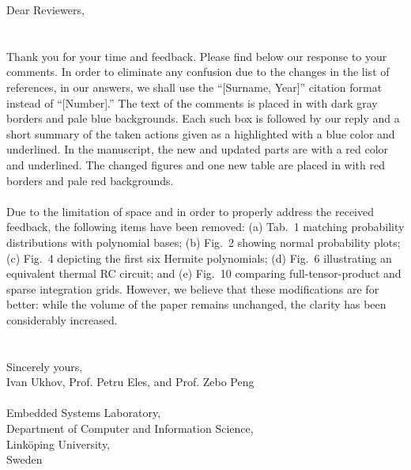 Dear Reviewers,
\\
\\
\\
\noindent Thank you for your time and feedback.
Please find below our response to your comments.
In order to eliminate any confusion due to the changes in the list of references, in our answers, we shall use the ``[Surname, Year]'' citation format instead of ``[Number].''
The text of the comments is placed in  with dark gray borders and pale blue backgrounds.
Each such box is followed by our reply and a short summary of the taken actions given as a  highlighted with a blue color and underlined.
In the manuscript, the new and updated parts are  with a red color and underlined.
The changed figures and one new table are placed in  with red borders and pale red backgrounds.
\\
\\
Due to the limitation of space and in order to properly address the received feedback, the following items have been removed:
(a) Tab.~1 matching probability distributions with polynomial bases;
(b) Fig.~2 showing normal probability plots;
(c) Fig.~4 depicting the first six Hermite polynomials;
(d) Fig.~6 illustrating an equivalent thermal RC circuit; and
(e) Fig.~10 comparing full-tensor-product and sparse integration grids.
However, we believe that these modifications are for better: while the volume of the paper remains unchanged, the clarity has been considerably increased.
\\
\\
\\
\noindent Sincerely yours,\\
Ivan Ukhov, Prof. Petru Eles, and Prof. Zebo Peng
\\
\\
\noindent Embedded Systems Laboratory,\\
Department of Computer and Information Science,\\
Link\"{o}ping University,\\
Sweden
